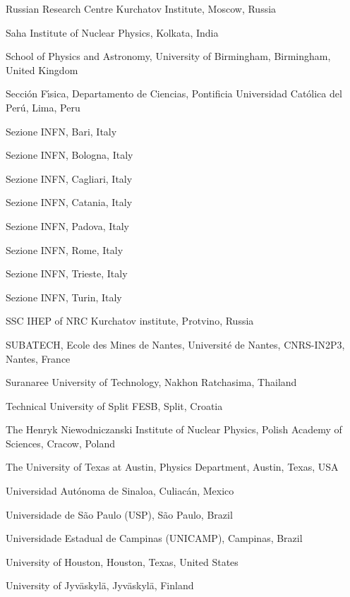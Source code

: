 \begin{flushleft}
\begin{Authlist}
\item {}Russian Research Centre Kurchatov Institute, Moscow, Russia
\item {}Saha Institute of Nuclear Physics, Kolkata, India
\item {}School of Physics and Astronomy, University of Birmingham, Birmingham, United Kingdom
\item {}Secci\'{o}n F\'{\i}sica, Departamento de Ciencias, Pontificia Universidad Cat\'{o}lica del Per\'{u}, Lima, Peru
\item {}Sezione INFN, Bari, Italy
\item {}Sezione INFN, Bologna, Italy
\item {}Sezione INFN, Cagliari, Italy
\item {}Sezione INFN, Catania, Italy
\item {}Sezione INFN, Padova, Italy
\item {}Sezione INFN, Rome, Italy
\item {}Sezione INFN, Trieste, Italy
\item {}Sezione INFN, Turin, Italy
\item {}SSC IHEP of NRC Kurchatov institute, Protvino, Russia
\item {}SUBATECH, Ecole des Mines de Nantes, Universit\'{e} de Nantes, CNRS-IN2P3, Nantes, France
\item {}Suranaree University of Technology, Nakhon Ratchasima, Thailand
\item {}Technical University of Split FESB, Split, Croatia
\item {}The Henryk Niewodniczanski Institute of Nuclear Physics, Polish Academy of Sciences, Cracow, Poland
\item {}The University of Texas at Austin, Physics Department, Austin, Texas, USA
\item {}Universidad Aut\'{o}noma de Sinaloa, Culiac\'{a}n, Mexico
\item {}Universidade de S\~{a}o Paulo (USP), S\~{a}o Paulo, Brazil
\item {}Universidade Estadual de Campinas (UNICAMP), Campinas, Brazil
\item {}University of Houston, Houston, Texas, United States
\item {}University of Jyv\"{a}skyl\"{a}, Jyv\"{a}skyl\"{a}, Finland

\end{Authlist}
\end{flushleft}
